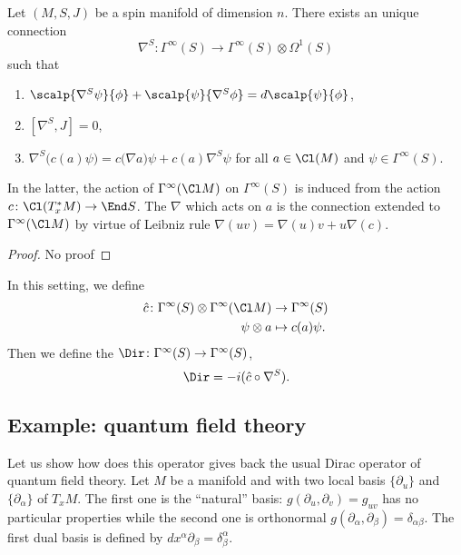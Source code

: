 \begin{theorem}
	Let $(M,S,J)$ be a spin manifold of dimension $n$. There exists an unique connection
	\[
		\nabla^S\colon \Gamma^{\infty}(S)\to \Gamma^{\infty}(S)\otimes\Omega^1(S)
	\]
	such that
	\begin{enumerate}
		\item $\scalp{ \nabla^S\psi }{ \phi }+\scalp{ \psi }{ \nabla^S\phi }=d\scalp{ \psi }{ \phi }$,
		\item $[\nabla^S,J]=0$,
		\item $\nabla^S\big( c(a)\psi \big)=c\big( \nabla a \big)\psi+c(a)\nabla^S\psi$ for all $a\in\Cl(M)$ and $\psi\in\Gamma^{\infty}(S)$.
	\end{enumerate}
	In the latter, the action of $\Gamma^{\infty}(\Cl M)$ on $\Gamma^{\infty}(S)$ is induced from the action $c\colon \Cl(T^*_xM)\to \End S$. The $\nabla$ which acts on $a$ is the connection extended to $\Gamma^{\infty}(\Cl M)$ by virtue of Leibniz rule $\nabla(uv)=\nabla(u)v+u\nabla(c)$.

\end{theorem}

\begin{proof}
	No proof
\end{proof}


In this setting, we define
\begin{equation}
	\begin{aligned}
		\hat c\colon\Gamma^{\infty}(S)\otimes\Gamma^{\infty}(\Cl M) & \to \Gamma^{\infty}(S) \\
		\psi\otimes a                                               & \mapsto c(a)\psi.
	\end{aligned}
\end{equation}
Then we define the  $\Dir\colon \Gamma^{\infty}(S)\to \Gamma^{\infty}(S)$,
\begin{equation}
	\Dir=-i(\hat c\circ\nabla^S).
\end{equation}

\subsection{Example: quantum field theory}

Let us show how does this operator gives back the usual Dirac operator of quantum field theory. Let $M$ be a manifold and with two local basis $\{ \partial_u \}$ and $\{ \partial_{\alpha} \}$ of $T_xM$. The first one is the ``natural'' basis: $g(\partial_u,\partial_v)=g_{uv}$ has no particular properties while the second one is orthonormal $g(\partial_{\alpha},\partial_{\beta})=\delta_{\alpha\beta}$. The first dual basis is defined by $dx^{\alpha}\partial_{\beta}=\delta^{\alpha}_{\beta}$.

